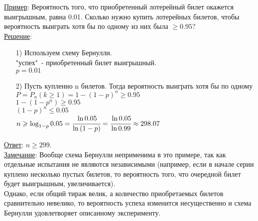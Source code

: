 \underline{Пример}: Вероятность того, что приобретенный лотерейный билет окажется выигрышным, равна 0.01. Сколько нужно купить лотерейных билетов, чтобы вероятность выиграть хотя бы по одному из них была $\geqslant 0.95$? \\
\underline{Решение}: \\
\begin{enumerate}
\item[1)] Используем схему Бернулли. \\
"успех"\ - приобретенный билет выигрышный. \\
$p = 0.01$ \\

\item[2)] Пусть купленно n билетов. Тогда вероятность выиграть хотя бы по одному \\
$P = P_n (k \geqslant 1) = 1 - (1 - p)^n \geqslant 0.95$ \\
$1 - (1 - p^n) \geqslant 0.95$ \\
$(1 - p)^n \leqslant 0.05$ \\
$n \geqslant \log_{1 - p} 0.05 = \cfrac{\ln{0.05}}{\ln{(1 - p)}} = \cfrac{\ln{0.05}}{\ln{0.99}} \approx 298.07$ 
\end{enumerate}
\underline{Ответ}: $n \geqslant 299$. \\
\underline{Замечание}: Вообще схема Бернулли неприменима в это примере, так как отдельные испытания не являются независимыми (например, если в начале серии куплено несколько пустых билетов, то вероятность того, что очередной билет будет выигрышным, увеличивается). \\
Однако, если общий тираж велик, а количество приобретаемых билетов сравнительно невелико, то вероятность успеха изменится несущественно и схема Бернулли удовлетворяет описанному эксперименту.



























